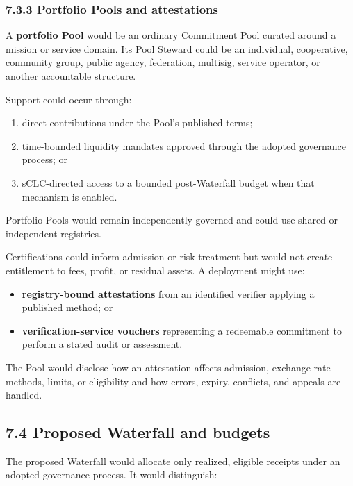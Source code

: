\documentclass[11pt]{article}
\begin{document}
\subsubsection*{7.3.3 Portfolio Pools and attestations}

A \textbf{portfolio Pool} would be an ordinary Commitment Pool curated around a mission or service domain. Its Pool Steward could be an individual, cooperative, community group, public agency, federation, multisig, service operator, or another accountable structure.

Support could occur through:

\begin{enumerate}[leftmargin=*]
\item direct contributions under the Pool's published terms;
\item time-bounded liquidity mandates approved through the adopted governance process; or
\item sCLC-directed access to a bounded post-Waterfall budget when that mechanism is enabled.
\end{enumerate}
Portfolio Pools would remain independently governed and could use shared or independent registries.

Certifications could inform admission or risk treatment but would not create entitlement to fees, profit, or residual assets. A deployment might use:

\begin{itemize}[leftmargin=*]
\item \textbf{registry-bound attestations} from an identified verifier applying a published method; or
\item \textbf{verification-service vouchers} representing a redeemable commitment to perform a stated audit or assessment.
\end{itemize}
The Pool would disclose how an attestation affects admission, exchange-rate methods, limits, or eligibility and how errors, expiry, conflicts, and appeals are handled.

\subsection*{7.4 Proposed Waterfall and budgets}

The proposed Waterfall would allocate only realized, eligible receipts under an adopted governance process. It would distinguish:
\end{document}
